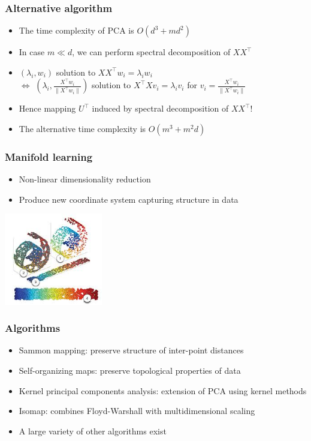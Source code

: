 \documentclass[10pt]{beamer}
\begin{document}
\begin{frame}
  \frametitle{Alternative algorithm}
  \begin{itemize}
	\item The time complexity of PCA is $O(d^3 + md^2)$
	\item In case $m \ll d$, we can perform spectral decomposition of $XX^\top$
	\item $(\lambda_i,w_i)$ solution to $XX^\top w_i=\lambda_iw_i$\\
	 $\Leftrightarrow$ $\left(\lambda_i,\frac {X^\top w_i} {\lVert X^\top w_i\rVert}\right)$ solution to $X^\top X v_i=\lambda_iv_i$ for $v_i=\frac {X^\top w_i} {\lVert X^\top w_i\rVert}$
	\item Hence mapping $U^\top$ induced by spectral decomposition of $XX^\top$!
	\item The alternative time complexity is $O(m^3 + m^2d)$
  \end{itemize}
\end{frame}

\begin{frame}
  \frametitle{Manifold learning}
  \begin{itemize}
	\item Non-linear dimensionality reduction
	\item Produce new coordinate system capturing structure in data
  \end{itemize}
  \centerline{\includegraphics[height=4cm]{images/manifold.jpeg}}
\end{frame}

\begin{frame}
  \frametitle{Algorithms}
  \begin{itemize}
	\item Sammon mapping: preserve structure of inter-point distances
	\item Self-organizing maps: preserve topological properties of data
	\item Kernel principal components analysis: extension of PCA using
		kernel methods
	\item Isomap: combines Floyd-Warshall with multidimensional scaling
	\item A large variety of other algorithms exist
  \end{itemize}
\end{frame}
\end{document}
